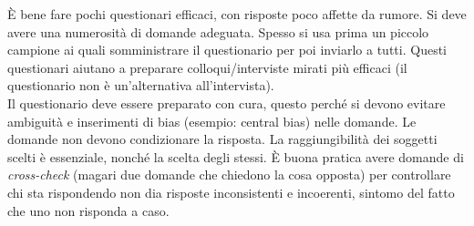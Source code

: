 È bene fare pochi questionari efficaci, con risposte poco affette da rumore. Si deve avere una numerosità di domande adeguata. Spesso si usa prima un piccolo campione ai quali somministrare il questionario per poi inviarlo a tutti. Questi questionari aiutano a preparare colloqui/interviste mirati più efficaci (il questionario non è un'alternativa all'intervista).\\  

Il questionario deve essere preparato con cura, questo perché si devono evitare ambiguità e inserimenti di bias (esempio: central bias) nelle domande. Le domande non devono condizionare la risposta. La raggiungibilità dei soggetti scelti è essenziale, nonché la scelta degli stessi. È buona pratica avere domande di \textit{cross-check} (magari due domande che chiedono la cosa opposta) per controllare chi sta rispondendo non dia risposte inconsistenti e incoerenti, sintomo del fatto che uno non risponda a caso.\\


